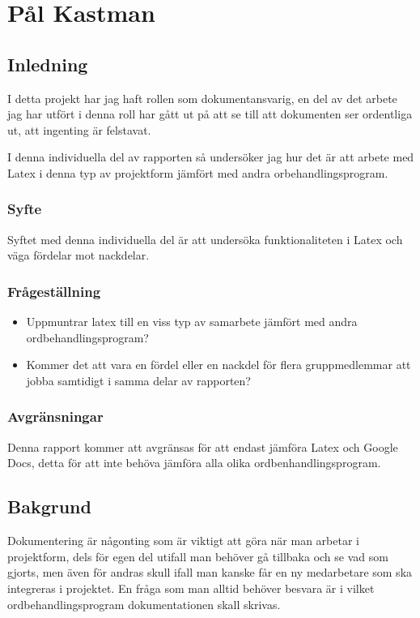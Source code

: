 \section{Pål Kastman}
\subsection{Inledning}
I detta projekt har jag haft rollen som dokumentansvarig, en del av det arbete jag har utfört i denna roll har gått ut på att se till att dokumenten ser ordentliga ut, att ingenting är felstavat.

I denna individuella del av rapporten så undersöker jag hur det är att arbete med Latex i denna typ av projektform jämfört med andra orbehandlingsprogram.

\subsubsection{Syfte}
Syftet med denna individuella del är att undersöka funktionaliteten i Latex och väga fördelar mot nackdelar.

\subsubsection{Frågeställning}
\begin{itemize}
\item Uppmuntrar latex till en viss typ av samarbete jämfört med andra ordbehandlingsprogram?
\item Kommer det att vara en fördel eller en nackdel för flera gruppmedlemmar att jobba samtidigt i samma delar av rapporten?
\end{itemize}

\subsubsection{Avgränsningar} %
Denna rapport kommer att avgränsas för att endast jämföra Latex och Google Docs, detta för att inte behöva jämföra alla olika ordbenhandlingsprogram.

\subsection{Bakgrund}
Dokumentering är någonting som är viktigt att göra när man arbetar i projektform, dels för egen del utifall man behöver gå tillbaka och se vad som gjorts, men även för andras skull ifall man kanske får en ny medarbetare som ska integreras i 
projektet. En fråga som man alltid behöver besvara är i vilket ordbehandlingsprogram dokumentationen skall skrivas. 

